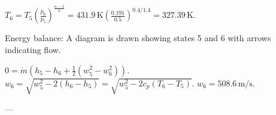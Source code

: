 \( T_6 = T_5 \left( \frac{p_6}{p_5} \right)^{\frac{\kappa - 1}{\kappa}} = 431.9 \, \text{K} \left( \frac{0.191}{0.5} \right)^{0.4 / 1.4} = 327.39 \, \text{K} \).  

Energy balance:  
A diagram is drawn showing states 5 and 6 with arrows indicating flow.  

\( 0 = \dot{m} \left( h_5 - h_6 + \frac{1}{2} (w_5^2 - w_6^2) \right) \).  
\( w_6 = \sqrt{w_5^2 - 2 (h_6 - h_5)} = \sqrt{w_5^2 - 2 c_p (T_6 - T_5)} \).  
\( w_6 = 508.6 \, \text{m/s} \).  

---